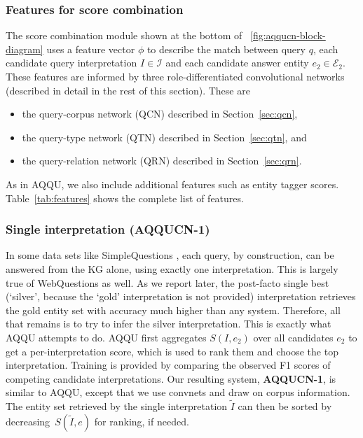 \documentclass{svjour3}
\begin{document}
\subsubsection{Features for score combination}
\label{sec:CombineFeatures}

The score combination module shown at the bottom of \figurename~\ref{fig:aqqucn-block-diagram} uses a feature vector $\phi$ to describe the match between query $q$, each candidate query interpretation $I \in \mathcal{I}$ and each candidate answer entity $e_2 \in \mathcal{E}_2$.   These features are informed by three role-differentiated convolutional networks (described in detail in the rest of this section).  These are
\begin{itemize}
\item the query-corpus network (QCN) described in Section~\ref{sec:qcn},
\item the query-type network (QTN) described in Section~\ref{sec:qtn}, and
\item the query-relation network (QRN) described in Section~\ref{sec:qrn}.
\end{itemize}
As in AQQU, we also include additional features such as entity tagger scores.  Table~\ref{tab:features} shows the complete list of features.


\subsubsection{Single interpretation (AQQUCN-1)}
\label{sec:aqqucn1}

In some data sets like SimpleQuestions \citep{BordesUCW2015MemNetQA}, each query, by construction, can be answered from the KG alone, using exactly one interpretation.  This is largely true of WebQuestions \citep{BerantCFL2013SEMPRE} as well.  As we report later, the post-facto single best (`silver', because the `gold' interpretation is not provided) interpretation retrieves the gold entity set with accuracy much higher than any system.  Therefore, all that remains is to try to infer the silver interpretation.  This is exactly what AQQU attempts to do.  AQQU first aggregates $S(I,e_2)$ over all candidates $e_2$ to get a per-interpretation score, which is used to rank them and choose the top interpretation.  Training is provided by comparing the observed F1 scores of competing candidate interpretations.  Our resulting system, \textbf{AQQUCN-1}, is similar to AQQU, except that we use convnets and draw on corpus information.  The entity set retrieved by the single interpretation $\tilde{I}$ can then be sorted by decreasing~$S(\tilde{I},e)$ for ranking, if needed.
\end{document}

